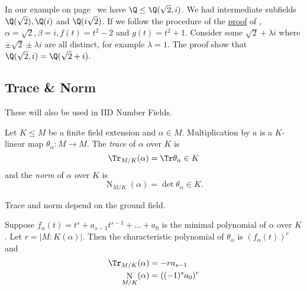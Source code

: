 \documentclass[a4paper]{article}
\DeclareMathOperator{\n}{N}
\begin{document}
\begin{ex}
  In our example on page~\pageref{eg:Q(sqrt 2, i)} we have \(\Q \leq \Q(\sqrt 2, i)\). We had intermediate subfields \(\Q(\sqrt 2), \Q(i)\) and \(\Q(i\sqrt 2)\). If we follow the procedure of the \hyperref[proof:primitive]{proof} of , \(\alpha = \sqrt 2, \beta = i, f(t) = t^2 - 2\) and \(g(t) = t^2 + 1\). Consider some \(\sqrt 2 + \lambda i\) where \(\pm \sqrt 2 \pm \lambda i\) are all distinct, for example \(\lambda = 1\). The proof show that \(\Q(\sqrt 2, i) = \Q(\sqrt 2 + i)\).
\end{ex}

\subsection{Trace \& Norm}

These will also be used in IID Number Fields.

\begin{definition}
  Let \(K \leq M\) be a finite field extension and \(\alpha \in M\). Multiplication by \(a\) is a \(K\)-linear map \(\theta_\alpha: M \to M\). The \emph{trace} of \(\alpha\) over \(K\) is
  \[
    \Tr_{M/K}(\alpha) = \Tr \theta_\alpha \in K
  \]
  and the \emph{norm} of \(\alpha\) over \(K\) is
  \[
    \n_{M/K}(\alpha) = \det \theta_\alpha \in K.
  \]
\end{definition}

\begin{note}
  Trace and norm depend on the ground field.
\end{note}

\begin{theorem}
  \label{thm:trace and norm}
  Suppose \(f_\alpha(t) = t^s + a_{s - 1}t^{s - 1} + \dots + a_0\) is the minimal polynomial of \(\alpha\) over \(K\). Let \(r = |M: K(\alpha)|\). Then the characteristic polynomial of \(\theta_\alpha\) is \((f_\alpha(t))^r\) and
  \begin{align*}
    \Tr_{M/K}(\alpha) &= -r a_{s-1} \\
    \n_{M/K}(\alpha) &= ((-1)^s a_0)^r
  \end{align*}
\end{theorem}
\end{document}
